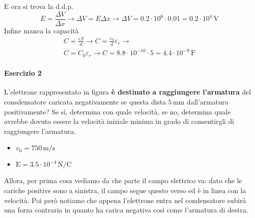 E ora si trova la d.d.p.
\begin{equation*}
  E = \frac{\Delta V}{\Delta x} \rightarrow \Delta V = E\Delta x \rightarrow 
  \Delta V = 0.2\cdot10^{6}\cdot0.01 = \boxed{0.2\cdot10^{4}\,\text{V}}
\end{equation*}
Infine manca la capacità
\begin{align*}
  C = \frac{\varepsilon S}{d} \rightarrow C =\frac{\varepsilon_0}{d}\varepsilon_r \rightarrow\\
  C = C_0\varepsilon_r \rightarrow C = 8.8\cdot10^{-10}\cdot5 = \boxed{4.4\cdot10^{-9}\,\text{F}}
\end{align*}

\paragraph{Esercizio 2}
L'elettrone rappresentato in figura \textbf{è destinato a raggiungere l'armatura} del consdensatore 
caricata negativamente se questa dista $5\,\text{mm}$ dall'armatura positivamente? Se sì, determina 
con quale velocità, se no, determina quale avrebbe dovuto essere la velocità iniziale minima in grado 
di consentirgli di raggiungere l'armatura.
\begin{itemize}
  \item $v_0 = 750\,\text{m/s}$
  \item $\text{E} = 3.5\cdot10^{-4}\,\text{N/C}$
\end{itemize}
\begin{center}
\end{center}
\divisor

Allora, per prima cosa vediamo da che parte il campo elettrico va: dato che le cariche positive sono a
sinistra, il campo segue questo verso ed è in linea con la velocità. Poi però notiamo che appena 
l'elettrone entra nel condensatore subirà una forza contraria in quanto ha carica negativa così come 
l'armatura di destra.\\[\baselineskip]

